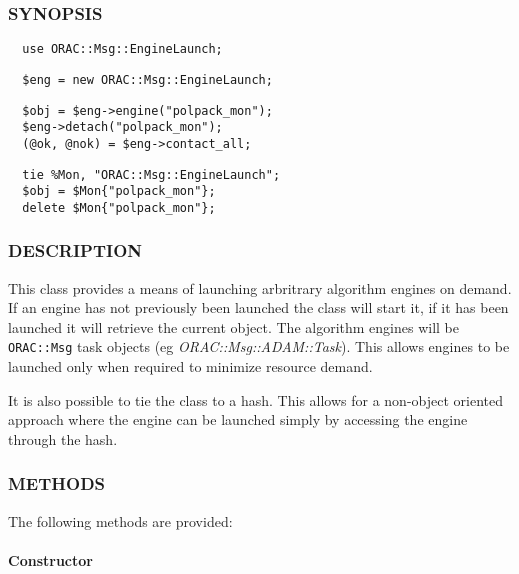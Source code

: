 \subsubsection*{SYNOPSIS\label{ORAC::Msg::EngineLaunch_SYNOPSIS}}
\begin{verbatim}
  use ORAC::Msg::EngineLaunch;
\end{verbatim}
\begin{verbatim}
  $eng = new ORAC::Msg::EngineLaunch;
\end{verbatim}
\begin{verbatim}
  $obj = $eng->engine("polpack_mon");
  $eng->detach("polpack_mon");
  (@ok, @nok) = $eng->contact_all;
\end{verbatim}
\begin{verbatim}
  tie %Mon, "ORAC::Msg::EngineLaunch";
  $obj = $Mon{"polpack_mon"};
  delete $Mon{"polpack_mon"};
\end{verbatim}
\subsubsection*{DESCRIPTION\label{ORAC::Msg::EngineLaunch_DESCRIPTION}}


This class provides a means of launching arbritrary algorithm
engines on demand. If an engine has not previously been
launched the class will start it, if it has been launched it
will retrieve the current object. The algorithm engines will
be \texttt{ORAC::Msg} task objects (eg \emph{ORAC::Msg::ADAM::Task}).
This allows engines to be launched only when required to minimize
resource demand.



It is also possible to tie the class to a hash. This allows
for a non-object oriented approach where the engine can be launched
simply by accessing the engine through the hash.

\subsubsection*{METHODS\label{ORAC::Msg::EngineLaunch_METHODS}}


The following methods are provided:

\paragraph*{Constructor\label{ORAC::Msg::EngineLaunch_Constructor}}


